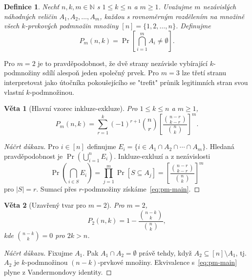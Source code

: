 \documentclass[11pt,a4paper]{article}
\newtheorem{definition}{Definice}
\newtheorem{theorem}{V\v{e}ta}
\begin{document}
\begin{definition}\label{def:pmnk}
Nechť $n, k, m \in \mathbb{N}$ s $1 \leq k \leq n$ a $m \geq 1$. Uvažujme $m$ nezávislých náhodných veličin $A_1, A_2, \ldots, A_m$, každou s rovnoměrným rozdělením na množině všech $k$-prvkových podmnožin množiny $[n] = \{1, 2, \ldots, n\}$. Definujme
\[
P_m(n, k) = \Pr\!\left[\bigcap_{i=1}^{m} A_i \neq \emptyset\right].
\]
\end{definition}

Pro $m = 2$ je to pravděpodobnost, že dvě strany nezávisle vybírající $k$-podmnožiny sdílí alespoň jeden společný prvek. Pro $m = 3$ lze třetí stranu interpretovat jako útočníka pokoušejícího se "trefit" průnik legitimních stran svou vlastní $k$-podmnožinou.

\begin{theorem}[Hlavní vzorec inkluze-exkluze]\label{thm:pm-formula}
Pro $1 \leq k \leq n$ a $m \geq 1$,
\begin{equation}\label{eq:pm-main}
P_m(n, k) = \sum_{r=1}^{k} (-1)^{r+1} \binom{n}{r} \left[\frac{\binom{n-r}{k-r}}{\binom{n}{k}}\right]^m.
\end{equation}
\end{theorem}

\begin{proof}[Náčrt důkazu]
Pro $i \in [n]$ definujme $E_i = \{i \in A_1 \cap A_2 \cap \cdots \cap A_m\}$. Hledaná pravděpodobnost je $\Pr(\bigcup_{i=1}^{n} E_i)$. Inkluze-exkluzí a z nezávislosti
\[
\Pr\!\left(\bigcap_{i \in S} E_i\right) = \prod_{j=1}^{m} \Pr[S \subseteq A_j] = \left[\frac{\binom{n-r}{k-r}}{\binom{n}{k}}\right]^m
\]
pro $|S| = r$. Sumací přes $r$-podmnožiny získáme~\eqref{eq:pm-main}.
\end{proof}

\begin{theorem}[Uzavřený tvar pro $m = 2$]\label{thm:p2-closed}
Pro $m = 2$,
\begin{equation}\label{eq:p2-closed}
P_2(n, k) = 1 - \frac{\binom{n-k}{k}}{\binom{n}{k}},
\end{equation}
kde $\binom{n-k}{k} = 0$ pro $2k > n$.
\end{theorem}

\begin{proof}[Náčrt důkazu]
Fixujme $A_1$. Pak $A_1 \cap A_2 = \emptyset$ právě tehdy, když $A_2 \subseteq [n] \setminus A_1$, tj. $A_2$ je $k$-podmnožinou $(n-k)$-prvkové množiny. Ekvivalence s~\eqref{eq:pm-main} plyne z Vandermondovy identity.
\end{proof}
\end{document}
